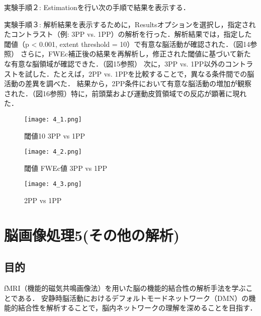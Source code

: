 \documentclass{jlreq}
\begin{document}
\begin{enumerate}
\begin{enumerate}
\begin{enumerate}
実験手順２: Estimationを行い次の手順で結果を表示する．

実験手順３: 解析結果を表示するために，Resultsオプションを選択し，指定されたコントラスト（例: 3PP vs. 1PP）の解析を行った．解析結果では，指定した閾値（p < 0.001, extent threshold = 10）で有意な脳活動が確認された．（図14参照）
さらに，FWEc補正後の結果を再解析し，修正された閾値に基づいて新たな有意な脳領域が確認できた．（図15参照）
次に，3PP vs. 1PP以外のコントラストを試した．たとえば，2PP vs. 1PPを比較することで，異なる条件間での脳活動の差異を調べた．
結果から，2PP条件において有意な脳活動の増加が観察された．（図16参照）特に，前頭葉および運動皮質領域での反応が顕著に現れた．
\begin{figure}[H]
    \centering
        \begin{minipage}{0.4\textwidth}
        \centering
        \texttt{[image: 4\_1.png]}
        \caption{閾値10 3PP vs 1PP}
        \label{fig:brain_T1}
    \end{minipage}
    \hfill
    \begin{minipage}{0.4\textwidth}
        \centering
        \texttt{[image: 4\_2.png]}
        \caption{閾値 FWEc値 3PP vs 1PP}
        \label{fig:brain_T1}
    \end{minipage}
    \hfill
\end{figure}


\begin{figure}[H]
    \centering
        \begin{minipage}{0.4\textwidth}
        \centering
        \texttt{[image: 4\_3.png]}
        \caption{2PP vs 1PP}
        \label{fig:brain_T1}
    \end{minipage}

\end{figure}
\section{脳画像処理5(その他の解析)}
\subsection{目的}
fMRI（機能的磁気共鳴画像法）を用いた脳の機能的結合性の解析手法を学ぶことである．
安静時脳活動におけるデフォルトモードネットワーク（DMN）の機能的結合性を解析することで，脳内ネットワークの理解を深めることを目指す．

\end{enumerate}
\end{enumerate}
\end{enumerate}
\end{document}
